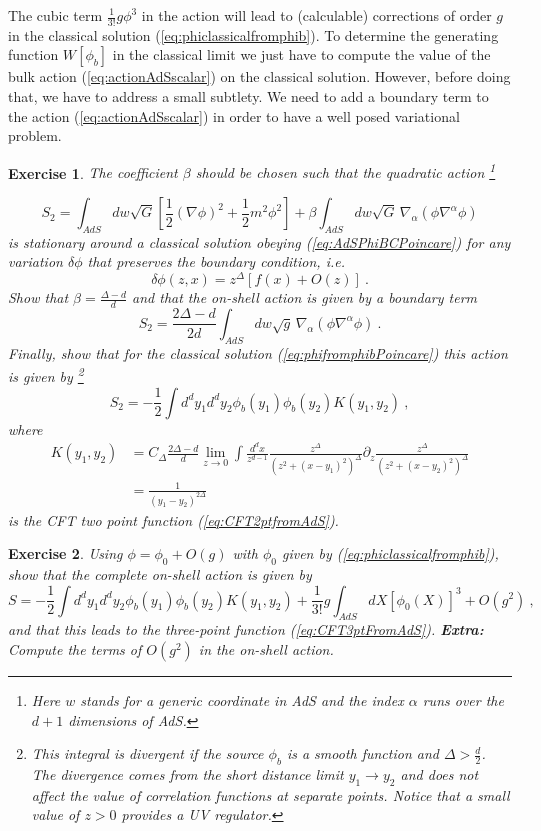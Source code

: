 \documentclass{ws-rv9x6}
\newtheorem{exercise}{Exercise}[section]
\newcommand\be{\begin{equation}}
\newcommand\ee{\end{equation}}
\begin{document}
The cubic term $\frac{1}{3!}g\phi^{3}$ in the action will lead to
(calculable) corrections of order $g$ in the classical solution (\ref{eq:phiclassicalfromphib}).
To determine the generating function $W[\phi_{b}]$ in the classical
limit we just have to compute the value of the bulk action (\ref{eq:actionAdSscalar})
on the classical solution. However, before doing that, we have to
address a small subtlety. We need to add a boundary term to the action
(\ref{eq:actionAdSscalar}) in order to have a well posed variational
problem.
\begin{exercise}
The coefficient $\beta$ should be chosen such that
the quadratic action %
\footnote{Here $w$ stands for a generic coordinate in AdS and the index $\alpha$
runs over the $d+1$ dimensions of AdS. %
}

\be
S_{2}=\int_{AdS}dw\sqrt{G}\left[\frac{1}{2}\left(\nabla\phi\right)^{2}+\frac{1}{2}m^{2}\phi^{2}\right]+\beta\int_{AdS}dw\sqrt{G}\,\nabla_{\alpha}\left(\phi\nabla^{\alpha}\phi\right)
\ee
is stationary around a classical solution obeying (\ref{eq:AdSPhiBCPoincare})
for any variation $\delta\phi$ that preserves the boundary condition,
i.e.
\be
\delta\phi(z,x)=z^{\Delta}\left[f(x)+O(z)\right]\ .
\ee
Show that $\beta=\frac{\Delta-d}{d}$ and that the on-shell action
is given by a boundary term
\be
S_{2}=\frac{2\Delta-d}{2d}\int_{AdS}dw\sqrt{g}\,\nabla_{\alpha}\left(\phi\nabla^{\alpha}\phi\right)\ .
\ee
Finally, show that for the classical solution (\ref{eq:phifromphibPoincare})
this action is given by %
\footnote{This integral is divergent if the source $\phi_{b}$ is a smooth function
and $\Delta>\frac{d}{2}$. The divergence comes from the short distance
limit $y_{1}\to y_{2}$ and does not affect the value of correlation
functions at separate points. Notice that a small value of $z>0$
provides a UV regulator. %
}
\be
S_{2}=-\frac{1}{2}\int d^{d}y_{1}d^{d}y_{2}\phi_{b}(y_{1})\phi_{b}(y_{2})K(y_{1},y_{2})\ ,
\ee
where
\begin{align}
K(y_{1},y_{2})&=C_{\Delta}\frac{2\Delta-d}{d}
\lim_{z\to0}\int \frac{d^{d}x}{z^{d-1}}
\frac{z^{\Delta}}{\left(z^{2}+(x-y_{1})^{2}\right)^{\Delta}}\partial_{z}\frac{z^{\Delta}}{\left(z^{2}+(x-y_{2})^{2}\right)^{\Delta}}\nonumber\\
&=\frac{1}{(y_{1}-y_{2})^{2\Delta}}
\end{align}
is the CFT two point function (\ref{eq:CFT2ptfromAdS}).
\end{exercise}
\begin{exercise}
Using $\phi=\phi_{0}+O(g)$ with $\phi_{0}$ given
by (\ref{eq:phiclassicalfromphib}), show that the complete on-shell
action is given by
\be
S=-\frac{1}{2}\int d^{d}y_{1}d^{d}y_{2}\phi_{b}(y_{1})\phi_{b}(y_{2})K(y_{1},y_{2})+\frac{1}{3!}g\int_{AdS}dX\left[\phi_{0}(X)\right]^{3}+O(g^{2})\ , \nonumber
\ee
and that this leads to the three-point function (\ref{eq:CFT3ptFromAdS}). 
{\bf Extra:} Compute the terms of $O(g^{2})$ in the on-shell action.
\end{exercise}
\end{document}
